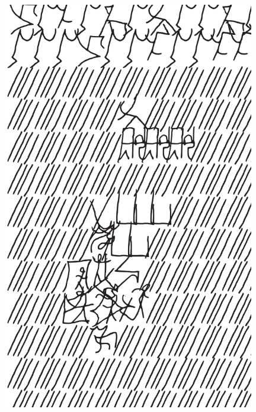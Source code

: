 \makeatletter\@openrightfalse
\movetooddpage
\begin{absolutelynopagebreak}
\begin{vplace}
\begin{figure}[H]
\begin{adjustwidth}{-0.99cm}{}
  \centering
  \vspace*{-1.77cm}
  \hspace*{-0.45cm}
  \includegraphics[width=110mm]{./imgs/img12.pdf}  
  \hfill
\end{adjustwidth}

\thispagestyle{empty}

\end{figure}
\end{vplace}

\end{absolutelynopagebreak}


